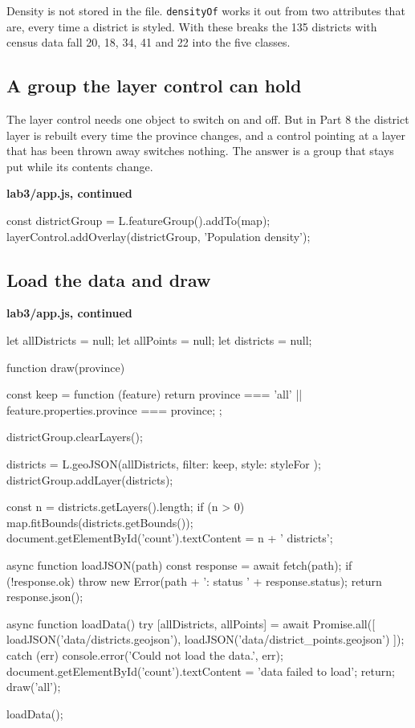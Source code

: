\documentclass{article}
\newcommand{\cd}[1]{\texttt{#1}}
\newcommand{\codecap}[1]{%
  \par\vspace{.9em}\noindent\textbf{#1}\par\vspace{-.6em}}
\begin{document}
Density is not stored in the file. \cd{densityOf} works it out from two
attributes that are, every time a district is styled. With these breaks
the 135 districts with census data fall 20, 18, 34, 41 and 22 into the
five classes.

\subsection{A group the layer control can hold}

The layer control needs one object to switch on and off. But in Part 8
the district layer is rebuilt every time the province changes, and a
control pointing at a layer that has been thrown away switches nothing.
The answer is a group that stays put while its contents change.

\codecap{lab3/app.js, continued}
\begin{code}
const districtGroup = L.featureGroup().addTo(map);
layerControl.addOverlay(districtGroup, 'Population density');
\end{code}

\subsection{Load the data and draw}

\codecap{lab3/app.js, continued}
\begin{code}
let allDistricts = null;
let allPoints = null;
let districts = null;

function draw(province) {
  const keep = function (feature) {
    return province === 'all' || feature.properties.province === province;
  };

  districtGroup.clearLayers();

  districts = L.geoJSON(allDistricts, {
    filter: keep,
    style: styleFor
  });
  districtGroup.addLayer(districts);

  const n = districts.getLayers().length;
  if (n > 0) {
    map.fitBounds(districts.getBounds());
  }
  document.getElementById('count').textContent = n + ' districts';
}

async function loadJSON(path) {
  const response = await fetch(path);
  if (!response.ok) {
    throw new Error(path + ': status ' + response.status);
  }
  return response.json();
}

async function loadData() {
  try {
    [allDistricts, allPoints] = await Promise.all([
      loadJSON('data/districts.geojson'),
      loadJSON('data/district_points.geojson')
    ]);
  } catch (err) {
    console.error('Could not load the data.', err);
    document.getElementById('count').textContent = 'data failed to load';
    return;
  }
  draw('all');
}

loadData();
\end{code}
\end{document}
